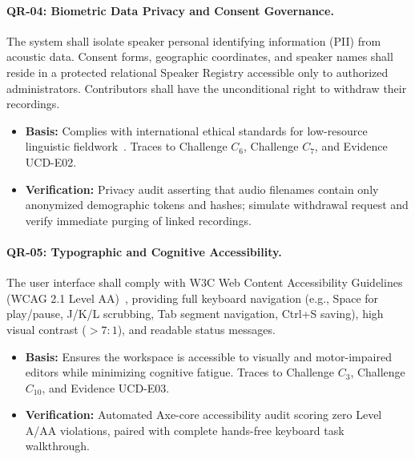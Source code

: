 \documentclass[a4paper,11pt]{article}
\begin{document}
\paragraph{QR-04: Biometric Data Privacy and Consent Governance.}
The system shall isolate speaker personal identifying information (PII) from acoustic data. Consent forms, geographic coordinates, and speaker names shall reside in a protected relational Speaker Registry accessible only to authorized administrators. Contributors shall have the unconditional right to withdraw their recordings.
\begin{itemize}
    \item \textbf{Basis:} Complies with international ethical standards for low-resource linguistic fieldwork~\cite{carroll2020care}. Traces to Challenge $C_6$, Challenge $C_7$, and Evidence UCD-E02.
    \item \textbf{Verification:} Privacy audit asserting that audio filenames contain only anonymized demographic tokens and hashes; simulate withdrawal request and verify immediate purging of linked recordings.
\end{itemize}

\paragraph{QR-05: Typographic and Cognitive Accessibility.}
The user interface shall comply with W3C Web Content Accessibility Guidelines (WCAG 2.1 Level AA)~\cite{w3c2018wcag}, providing full keyboard navigation (e.g., Space for play/pause, J/K/L scrubbing, Tab segment navigation, Ctrl+S saving), high visual contrast ($>7:1$), and readable status messages.
\begin{itemize}
    \item \textbf{Basis:} Ensures the workspace is accessible to visually and motor-impaired editors while minimizing cognitive fatigue. Traces to Challenge $C_3$, Challenge $C_{10}$, and Evidence UCD-E03.
    \item \textbf{Verification:} Automated Axe-core accessibility audit scoring zero Level A/AA violations, paired with complete hands-free keyboard task walkthrough.
\end{itemize}
\end{document}
